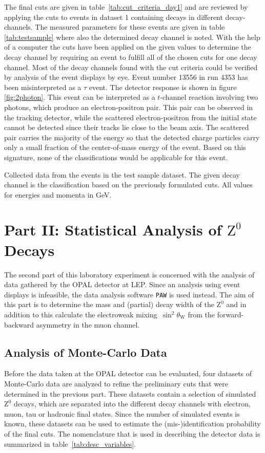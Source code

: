 \documentclass[11pt, a4paper]{article}
\numberwithin{equation}{section}
\begin{document}
The final cuts are given in table~\ref{tab:cut_criteria_day1} and are reviewed by applying the cuts to events in dataset 1 containing decays in different decay-channels.
The measured parameters for these events are given in table \ref{tab:testsample} where also the determined decay channel is noted.
With the help of a computer the cuts have been applied on the given values to determine the decay channel by requiring an event to fulfill all of the chosen cuts for one decay channel.
Most of the decay channels found with the cut criteria could be verified by analysis of the event displays by eye.
Event number \num{13556} in run \num{4353} has been misinterpreted as a $\tau$ event.
The detector response is shown in figure \ref{fig:2photon}.
This event can be interpreted as a $t$-channel reaction involving two photons, which produce an electron-positron pair.
This pair can be observed in the tracking detector, while the scattered electron-positron from the initial state cannot be detected since their tracks lie close to the beam axis.
The scattered pair carries the majority of the energy so that the detected charge particles carry only a small fraction of the center-of-mass energy of the event.
Based on this signature, none of the classifications would be applicable for this event.
\begin{table}
	\centering
		
	\caption{Collected data from the events in the test sample dataset. The given decay channel is the classification based on the previously formulated cuts. All values for energies and momenta in \si{GeV}.}
	\label{tab:testsample}
\end{table}

\clearpage
\section{Part II: Statistical Analysis of $\mathrm{Z}^0$ Decays}
The second part of this laboratory experiment is concerned with the analysis of data gathered by the OPAL detector at LEP.
Since an analysis using event displays is infeasible, the data analysis software \texttt{PAW} is used instead.
The aim of this part is to determine the mass and (partial) decay width of the $\mathrm{Z}^0$ and in addition to this calculate the electroweak mixing~$\sin^2\theta_\mathrm{W}$ from the forward-backward asymmetry in the muon channel.

\subsection{Analysis of Monte-Carlo Data}
\label{sec:analysis_mc_data}
Before the data taken at the OPAL detector can be evaluated, four datasets of Monte-Carlo data are analyzed to refine the preliminary cuts that were determined in the previous part.
These datasets contain a selection of simulated $\mathrm{Z}^0$ decays, which are separated into the different decay channels with electron, muon, tau or hadronic final states.
Since the number of simulated events is known, these datasets can be used to estimate the (mis-)identification probability of the final cuts.
The nomenclature that is used in describing the detector data is summarized in table~\ref{tab:desc_variables}.
\end{document}
